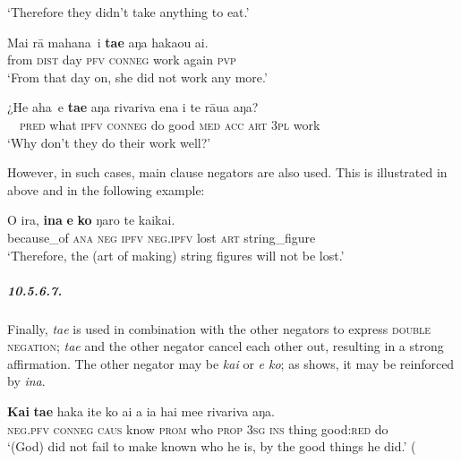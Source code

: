 \glt 
‘Therefore they didn’t take anything to eat.’ \textstyleExampleref{[R303.053]} 
\z

\ea\label{ex:10.157}
\gll {\ob}Mai rā mahana\,{\cb} i \textbf{ta{\ꞌ}e} aŋa haka{\ꞌ}ou ai.\\
{\db}from \textsc{dist} day \textsc{pfv} \textsc{conneg} work again \textsc{pvp}\\

\glt 
‘From that day on, she did not work any more.’ \textstyleExampleref{[R441.005]} 
\z

\ea\label{ex:10.158}
\gll ¿{\ob}He aha\,{\cb} e \textbf{ta{\ꞌ}e} aŋa rivariva ena i te rāua aŋa? \\
~~\textsc{pred} what \textsc{ipfv} \textsc{conneg} do good \textsc{med} \textsc{acc} \textsc{art} \textsc{3pl} work \\

\glt
‘Why don’t they do their work well?’ \textstyleExampleref{[R648.249]} 
\z

However, in such cases, main clause negators are also used. This is illustrated in  above and in the following example:

\ea\label{ex:10.159}
\gll {\ꞌ}O ira, \textbf{{\ꞌ}ina} \textbf{e} \textbf{ko} ŋaro te kaikai. \\
because\_of \textsc{ana} \textsc{neg} \textsc{ipfv} \textsc{neg.ipfv} lost \textsc{art} string\_figure \\

\glt 
‘Therefore, the (art of making) string figures will not be lost.’ \textstyleExampleref{[R648.133]} 
\z

\subparagraph{10.5.6.7.} Finally, \textit{ta{\ꞌ}e} is used in combination with the other negators to express \textsc{double negation}; \textit{ta{\ꞌ}e} and the other negator cancel each other out, resulting in a strong affirmation. The other negator may be \textit{kai} or \textit{e ko}; as  shows, it may be reinforced by \textit{{\ꞌ}ina}.

\ea\label{ex:10.160}
\gll \textbf{Kai} \textbf{ta{\ꞌ}e} haka {\ꞌ}ite ko ai a ia hai me{\ꞌ}e rivariva aŋa. \\
\textsc{neg.pfv} \textsc{conneg} \textsc{caus} know \textsc{prom} who \textsc{prop} \textsc{3sg} \textsc{ins} thing good:\textsc{red} do \\

\glt 
‘(God) did not fail to make known who he is, by the good things he did.’ (\textstyleExampleref{Acts 14:17]}\textstyleExampleref{} 
\z

